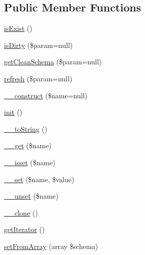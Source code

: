 \subsection*{Public Member Functions}
\begin{DoxyCompactItemize}
\item 
\hyperlink{classZendDbSchema__Db__Schema__AbstractSchema_a1680a8fd22360f74d29b641d7257a52f}{is\-Exist} ()
\item 
\hyperlink{classZendDbSchema__Db__Schema__AbstractSchema_ae859790a91bbcb9c4dc52a6139e5999e}{is\-Dirty} (\$param=null)
\item 
\hyperlink{classZendDbSchema__Db__Schema__AbstractSchema_a46da7a60c7e5fd605607afbc1dac4baa}{get\-Clean\-Schema} (\$param=null)
\item 
\hyperlink{classZendDbSchema__Db__Schema__AbstractSchema_a84673a5d69f10fec5b31294bf53f6d56}{refresh} (\$param=null)
\item 
\hyperlink{classZendDbSchema__Db__Schema__AbstractSchema_a95b8986f7fa3a4e26be024d3a621e4f6}{\-\_\-\-\_\-construct} (\$name=null)
\item 
\hyperlink{classZendDbSchema__Db__Schema__AbstractSchema_abdb3f6e9b394b51512ce1567bb252b63}{init} ()
\item 
\hyperlink{classZendDbSchema__Db__Schema__AbstractSchema_aafc458a7c19c74314889da4a99e457ff}{\-\_\-\-\_\-to\-String} ()
\item 
\hyperlink{classZendDbSchema__Db__Schema__AbstractSchema_a54d32c6f15463eaad2321a9f0e7225d7}{\-\_\-\-\_\-get} (\$name)
\item 
\hyperlink{classZendDbSchema__Db__Schema__AbstractSchema_ac4e121ba7932163eb1950fabe06fb9db}{\-\_\-\-\_\-isset} (\$name)
\item 
\hyperlink{classZendDbSchema__Db__Schema__AbstractSchema_ab4282a1fd6f4d9f23d01de8328072c71}{\-\_\-\-\_\-set} (\$name, \$value)
\item 
\hyperlink{classZendDbSchema__Db__Schema__AbstractSchema_a64e2e307b4dd0bf4785258f82e9fcc1b}{\-\_\-\-\_\-unset} (\$name)
\item 
\hyperlink{classZendDbSchema__Db__Schema__AbstractSchema_aad51a69a1cfd48479c393fcab4f11257}{\-\_\-\-\_\-clone} ()
\item 
\hyperlink{classZendDbSchema__Db__Schema__AbstractSchema_a999c9d65aa9a31f25836aae747a10a11}{get\-Iterator} ()
\item 
\hyperlink{classZendDbSchema__Db__Schema__AbstractSchema_acd81590f02c831ff4c4a442c5cf47074}{set\-From\-Array} (array \$schema)
\item 

\end{DoxyCompactItemize}
